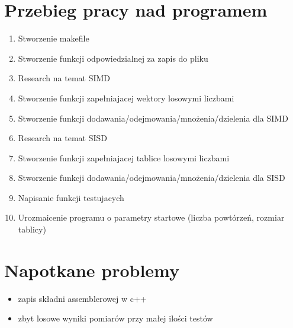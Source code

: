 \documentclass[11pt]{article}
\begin{document}
\section{Przebieg pracy nad programem}
\begin{enumerate}
    \item      Stworzenie makefile
    \item      Stworzenie funkcji odpowiedzialnej za zapis do pliku
    \item      Research na temat SIMD
    \item      Stworzenie funkcji zapełniajacej wektory losowymi liczbami
    \item      Stworzenie funkcji dodawania/odejmowania/mnożenia/dzielenia dla SIMD
    \item      Research na temat SISD
    \item      Stworzenie funkcji zapełniajacej tablice losowymi liczbami
    \item      Stworzenie funkcji dodawania/odejmowania/mnożenia/dzielenia dla SISD
    \item      Napisanie funkcji testujacych
    \item      Urozmaicenie programu o parametry startowe (liczba powtórzeń, rozmiar tablicy)
\end{enumerate}
\section{Napotkane problemy}
\begin{itemize}
    \item  zapis składni assemblerowej w c++
    \item  zbyt losowe wyniki pomiarów przy małej ilości testów
\end{itemize}
\clearpage
\end{document}
